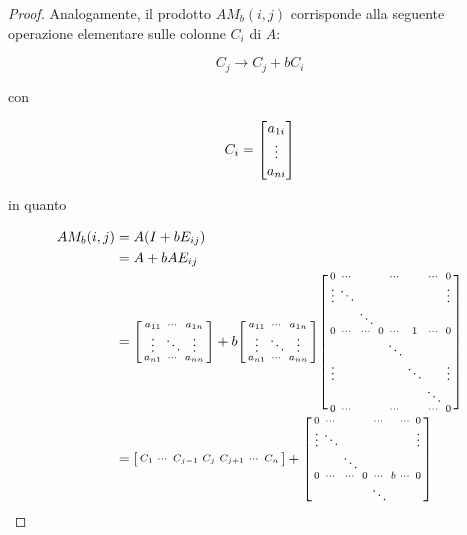 \begin{proof}
	Analogamente, il prodotto $ A M_{b}(i,j) $ corrisponde alla seguente operazione elementare sulle colonne $ C_{i} $ di $ A $:
	
	\begin{equation}
		C_{j} \to C_{j} + b C_{i}
	\end{equation}

	con
	
	\begin{equation}
		C_{i} = \bmqty{ a_{1i} \\ \vdots \\ a_{ni} }
	\end{equation}
	
	in quanto
	
	\begin{align}
		\begin{split}
			A M_{b}(i,j) &= A (I + b E_{ij}) \\
			&= A + b A E_{ij} \\
			&= \sbmqty{ %
						a_{11} & \cdots & a_{1n} \\
						\vdots & \ddots & \vdots \\
						a_{n1} & \cdots & a_{nn} %
						} + %
			b \sbmqty{ %
						a_{11} & \cdots & a_{1n} \\
						\vdots & \ddots & \vdots \\
						a_{n1} & \cdots & a_{nn} %
						} %
			\sbmqty{ %
						0 & \cdots & & & \cdots & & \cdots & 0 \\
						\vdots & \ddots & & & & & & \vdots \\
						& & \ddots & & & & & \\
						0 & \cdots & \cdots & 0 & \cdots & 1 & \cdots & 0 \\
						& & & & \ddots & & & \\
						\vdots & & & & & \ddots & & \vdots \\
						& & & & & & \ddots & \\
						0 & \cdots & & & \cdots & & \cdots & 0 %
						} \\
			&= \sbmqty{ %
						C_{1} & \cdots & C_{j-1} & C_{j} & C_{j+1} & \cdots & C_{n} %
						} + %
				\sbmqty{ %
							0 & \cdots & & & \cdots & & \cdots & 0 \\
							\vdots & \ddots & & & & & & \vdots \\
							& & \ddots & & & & & \\
							0 & \cdots & \cdots & 0 & \cdots & b & \cdots & 0 \\
							& & & & \ddots & & & \\
}
\end{split}
\end{align}
\end{proof}
